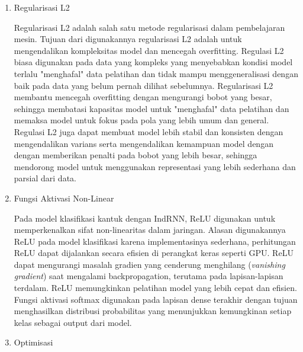 \begin{enumerate}[nolistsep]
      \item Regularisasi L2

            Regularisasi L2 adalah salah satu metode regularisasi dalam pembelajaran mesin. Tujuan dari digunakannya regularisasi L2
            adalah untuk mengendalikan kompleksitas model dan mencegah overfitting. Regulasi L2 biasa digunakan pada data yang kompleks yang
            menyebabkan kondisi model terlalu "menghafal" data pelatihan dan tidak mampu menggeneralisasi dengan baik pada data yang
            belum pernah dilihat sebelumnya. Regularisasi L2 membantu mencegah overfitting dengan mengurangi bobot yang besar, sehingga
            membatasi kapasitas model untuk "menghafal" data pelatihan dan memaksa model untuk fokus pada pola yang lebih umum dan general.
            Regulasi L2 juga dapat membuat model lebih stabil dan konsisten dengan mengendalikan varians serta mengendalikan kemampuan model
            dengan dengan memberikan penalti pada bobot yang lebih besar, sehingga mendorong model untuk menggunakan representasi yang lebih
            sederhana dan parsial dari data.

      \item Fungsi Aktivasi Non-Linear

            Pada model klasifikasi kantuk dengan IndRNN, ReLU digunakan untuk memperkenalkan sifat non-linearitas dalam jaringan.
            Alasan digunakannya ReLU pada model klasifikasi karena implementasinya sederhana, perhitungan ReLU dapat dijalankan
            secara efisien di perangkat keras seperti GPU. ReLU dapat mengurangi masalah gradien yang cenderung menghilang
            (\emph{vanishing gradient}) saat mengalami backpropagation, terutama pada lapisan-lapisan terdalam. ReLU memungkinkan pelatihan
            model yang lebih cepat dan efisien. Fungsi aktivasi softmax digunakan pada lapisan dense terakhir dengan tujuan
            menghasilkan distribusi probabilitas yang menunjukkan kemungkinan setiap kelas sebagai output dari model.

      \item Optimisasi


\end{enumerate}
